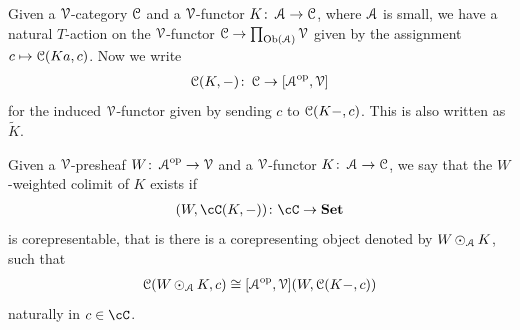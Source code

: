 \documentclass[a4paper,11pt,oneside,openany]{scrbook}
\begin{document}
\begin{defn}
   Given a $\V$-category $\C$ and a $\V$-functor $K \from \A \to \C$, where $\A$ is small, we have a natural $T$-action on the $\V$-functor 
   $\C \to \prod_{\Ob(\A)}\V$ given by the assignment $c \mapsto \C(Ka,c)$. Now we write 
      \begin{align*}
         \C(K,-) \from \C \to [\A^{\op},\V]
      \end{align*}
   for the induced $\V$-functor given by sending $c$ to $\C(K-,c)$. This is also written as $\widetilde{K}$.
\end{defn}

\begin{defn}
   Given a $\V$-presheaf $W\from \A^{\op} \to \V$ and a $\V$-functor $K \from \A \to \C$, we say that the $W$-weighted colimit of $K$ exists if 
      \begin{align*}
         [\A^{\op},\V](W,\cC(K,-))\colon\cC\rightarrow\Set
      \end{align*} 
   is corepresentable, that is there is a corepresenting object denoted by $W \copw_{\A} K$, such that
      \begin{align*}
         \C(W\copw_{\A} K, c) \iso [\A^{\op},\V](W,\C(K-,c))
      \end{align*}
      naturally in $c\in\cC$.
\end{defn}
  
\end{document}
